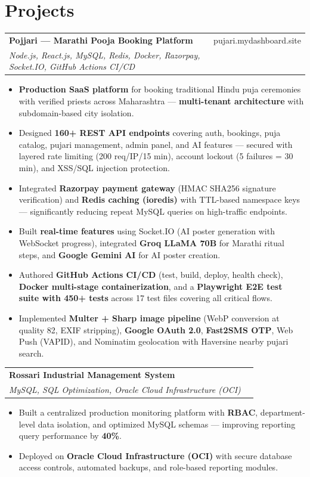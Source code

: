 \documentclass[a4paper,11pt]{article}
\makeatletter
\newcommand{\cvitem}[1]{
  \item\small{\color{darkgray}#1}\vspace{0pt}
}
\newcommand{\projectheading}[3]{
  \vspace{4pt}
  \noindent\begin{tabular*}{\textwidth}{@{}l@{\extracolsep{\fill}}r@{}}
    \textbf{\color{darkgray}#1} & \small\color{primary}#3 \\[-2pt]
    \small\textit{\color{medgray}#2} & \\
  \end{tabular*}\vspace{-6pt}
}
\newcommand{\cvlist}{\begin{itemize}[leftmargin=0.20in, rightmargin=0in, topsep=4pt, itemsep=3pt, parsep=0pt]}
\newcommand{\cvlistend}{\end{itemize}\vspace{3pt}}
\makeatother
\begin{document}
\vspace{-2pt}

\section{Projects}

\projectheading{Pojjari --- Marathi Pooja Booking Platform}{Node.js, React.js, MySQL, Redis, Docker, Razorpay, Socket.IO, GitHub Actions CI/CD}{\faLink\ pujari.mydashboard.site}

\cvlist
  \cvitem{\textbf{Production SaaS platform} for booking traditional Hindu puja ceremonies with verified priests across Maharashtra --- \textbf{multi-tenant architecture} with subdomain-based city isolation.}
  \cvitem{Designed \textbf{160+ REST API endpoints} covering auth, bookings, puja catalog, pujari management, admin panel, and AI features --- secured with layered rate limiting (200 req/IP/15 min), account lockout (5 failures = 30 min), and XSS/SQL injection protection.}
  \cvitem{Integrated \textbf{Razorpay payment gateway} (HMAC SHA256 signature verification) and \textbf{Redis caching (ioredis)} with TTL-based namespace keys --- significantly reducing repeat MySQL queries on high-traffic endpoints.}
  \cvitem{Built \textbf{real-time features} using Socket.IO (AI poster generation with WebSocket progress), integrated \textbf{Groq LLaMA 70B} for Marathi ritual steps, and \textbf{Google Gemini AI} for AI poster creation.}
  \cvitem{Authored \textbf{GitHub Actions CI/CD} (test, build, deploy, health check), \textbf{Docker multi-stage containerization}, and a \textbf{Playwright E2E test suite with 450+ tests} across 17 test files covering all critical flows.}
  \cvitem{Implemented \textbf{Multer + Sharp image pipeline} (WebP conversion at quality 82, EXIF stripping), \textbf{Google OAuth 2.0}, \textbf{Fast2SMS OTP}, Web Push (VAPID), and Nominatim geolocation with Haversine nearby pujari search.}
\cvlistend

\projectheading{Rossari Industrial Management System}{MySQL, SQL Optimization, Oracle Cloud Infrastructure (OCI)}{}

\cvlist
  \cvitem{Built a centralized production monitoring platform with \textbf{RBAC}, department-level data isolation, and optimized MySQL schemas --- improving reporting query performance by \textbf{40\%}.}
  \cvitem{Deployed on \textbf{Oracle Cloud Infrastructure (OCI)} with secure database access controls, automated backups, and role-based reporting modules.}
\cvlistend
\end{document}
